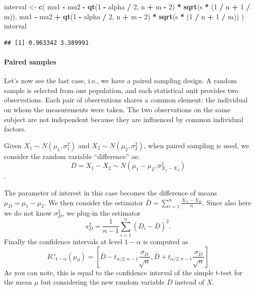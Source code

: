 \documentclass[
]{article}
\newenvironment{Shaded}{\begin{snugshade}}{\end{snugshade}}
\newcommand{\DecValTok}[1]{\textcolor[rgb]{0.00,0.00,0.81}{#1}}
\newcommand{\FunctionTok}[1]{\textcolor[rgb]{0.13,0.29,0.53}{\textbf{#1}}}
\newcommand{\NormalTok}[1]{#1}
\newcommand{\OtherTok}[1]{\textcolor[rgb]{0.56,0.35,0.01}{#1}}
\newcommand{\SpecialCharTok}[1]{\textcolor[rgb]{0.81,0.36,0.00}{\textbf{#1}}}
\begin{document}
\begin{Shaded}
\begin{Highlighting}[]
\NormalTok{interval }\OtherTok{\textless{}{-}} \FunctionTok{c}\NormalTok{(}
\NormalTok{  mu1 }\SpecialCharTok{{-}}\NormalTok{ mu2 }\SpecialCharTok{{-}} \FunctionTok{qt}\NormalTok{(}\DecValTok{1} \SpecialCharTok{{-}}\NormalTok{ alpha }\SpecialCharTok{/} \DecValTok{2}\NormalTok{, n }\SpecialCharTok{+}\NormalTok{ m }\SpecialCharTok{{-}} \DecValTok{2}\NormalTok{) }\SpecialCharTok{*} \FunctionTok{sqrt}\NormalTok{(s }\SpecialCharTok{*}\NormalTok{ (}\DecValTok{1} \SpecialCharTok{/}\NormalTok{ n }\SpecialCharTok{+} \DecValTok{1} \SpecialCharTok{/}\NormalTok{ m)),}
\NormalTok{  mu1 }\SpecialCharTok{{-}}\NormalTok{ mu2 }\SpecialCharTok{+} \FunctionTok{qt}\NormalTok{(}\DecValTok{1} \SpecialCharTok{{-}}\NormalTok{ alpha }\SpecialCharTok{/} \DecValTok{2}\NormalTok{, n }\SpecialCharTok{+}\NormalTok{ m }\SpecialCharTok{{-}} \DecValTok{2}\NormalTok{) }\SpecialCharTok{*} \FunctionTok{sqrt}\NormalTok{(s }\SpecialCharTok{*}\NormalTok{ (}\DecValTok{1} \SpecialCharTok{/}\NormalTok{ n }\SpecialCharTok{+} \DecValTok{1} \SpecialCharTok{/}\NormalTok{ m))}
\NormalTok{)}
\NormalTok{interval}
\end{Highlighting}
\end{Shaded}

\begin{verbatim}
## [1] 0.963342 3.389991
\end{verbatim}

\hypertarget{paired-samples}{%
\paragraph{Paired samples}\label{paired-samples}}

Let's now see the last case, i.e., we have a paired sampling design. A
random sample is selected from one population, and each statistical unit
provides two observations. Each pair of observations shares a common
element: the individual on whom the measurements were taken. The two
observations on the same subject are not independent because they are
influenced by common individual factors.

Given \(X_1 \sim N(\mu_1,\sigma^2_1)\) and
\(X_2\sim N(\mu_2,\sigma^2_2)\), when paired sampling is used, we
consider the random variable ``difference'' as:
\[D=X_1-X_2 \sim N(\mu_1-\mu_2,\sigma^2_{X_1-X_2})\].

The parameter of interest in this case becomes the difference of means
\(\mu_D=\mu_1-\mu_2\). We then consider the estimator
\(\bar{D} = \sum_{i=1}^n \frac{X_{1i} - X_{2i}}{n}\). Since also here we
do not know \(\sigma^2_D\), we plug-in the estimator
\[s^2_D = \frac{1}{n-1}\sum_{i=1}^n (D_i-\bar{D})^2.\] Finally the
confidence intervals at level \(1-\alpha\) is computed as
\[IC_{1-\alpha}(\mu_d)=\left[\bar{D}-t_{\alpha/2,n-1}\frac{\sigma_D}{\sqrt{n}},\bar{D}+t_{\alpha/2,n-1}\frac{\sigma_D}{\sqrt{n}}\right]\]
As you can note, this is equal to the confidence interval of the simple
t-test for the mean \(\mu\) but considering the new random variable
\(D\) instead of \(X\).
\end{document}
